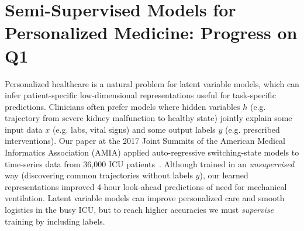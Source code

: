 \documentclass[11pt,letterpaper]{article}
\begin{document}

\section*{Semi-Supervised Models for Personalized Medicine: Progress on Q1}

Personalized healthcare is a natural problem for latent variable models, which can infer patient-specific low-dimensional representations useful for task-specific predictions.
Clinicians often prefer models where hidden variables $h$ (e.g. trajectory from severe kidney malfunction to healthy state) jointly explain some input data $x$ (e.g. labs, vital signs) and some output labels $y$ (e.g. prescribed interventions).
Our paper at the 2017 Joint Summits of the American Medical Informatics Association (AMIA) applied auto-regressive switching-state models to time-series data from 36,000 ICU patients~\citep{ghassemi2017ssam}.
Although trained in an \emph{unsupervised} way (discovering common trajectories without labels $y$), our learned representations improved 4-hour look-ahead predictions of need for mechanical ventilation. Latent variable models can improve personalized care and smooth logistics in the busy ICU, but 
to reach higher accuracies 
we must \emph{supervise} training by including labels.
\end{document}
